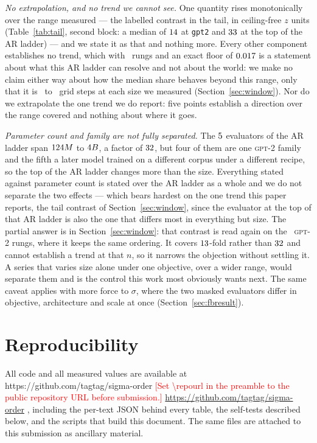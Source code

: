 \documentclass[11pt]{article}
\newcommand{\repourl}{}
\renewcommand{\repourl}{https://github.com/tagtag/sigma-order}
\newcommand{\repoline}{%
  \ifx\repourl\empty
    \todo{Set \textbackslash repourl in the preamble to the public
      repository URL before submission.}%
  \else
    \url{\repourl}%
  \fi}
\newcommand{\todo}[1]{\textcolor{red}{[#1]}}
\begin{document}
\emph{No extrapolation, and no trend we cannot see.}  One quantity rises
monotonically over the range measured --- the labelled contrast in the
tail, in ceiling-free $z$ units (Table~\ref{tab:tail}, second block: a median
of $14$ at \texttt{gpt2} and $33$ at the top of the
AR ladder) --- and we state it as that and nothing more.  Every other component establishes no trend, which with \TrendNEval\
rungs and an exact floor of $0.017$ is a statement about what this
AR ladder can resolve and not about the world: we make no claim either way
about how the median share behaves beyond this range, only that it is
\CausalCompStepsMin\ to \CausalCompStepsMax\ grid steps at each size we
measured
(Section~\ref{sec:window}).  Nor do we extrapolate the one trend we do
report: five points establish a direction over the range covered and
nothing about where it goes.

\emph{Parameter count and family are not fully separated.}  The $5$ evaluators
of the AR ladder span $124M$ to $4B$, a factor of
$32$, but four of them are one \textsc{gpt-2} family and the fifth
a later model trained on a different corpus under a different recipe, so the
top of the AR ladder changes more than the size.  Everything stated against
parameter count is stated over the AR ladder as a whole and we do not separate the
two effects --- which bears hardest on the one trend this paper reports,
the tail contrast of Section~\ref{sec:window}, since the evaluator at the
top of that AR ladder is also the one that differs most in everything but
size.  The partial answer is in Section~\ref{sec:window}: that contrast is
read again on the \TailZFamNEval\ \textsc{gpt-2} rungs, where it keeps
the same ordering.  It covers $13$-fold rather than
$32$ and cannot establish a trend at that $n$, so it narrows the
objection without settling it.  A series that varies size
alone under one objective, over a wider range, would separate them and is the
control this work most obviously wants next.  The same caveat applies with
more force to $\sigma$, where the two masked evaluators differ in objective,
architecture and scale at once (Section~\ref{sec:fbresult}).

\section*{Reproducibility}

All code and all measured values are available at \repoline, including the
per-text JSON behind every table, the self-tests described below, and the
scripts that build this document.  The same files are attached to this
submission as ancillary material.
\end{document}
